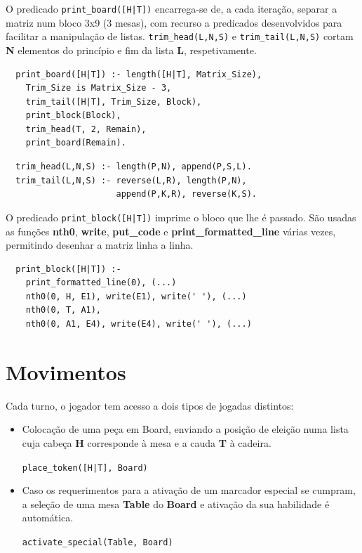 \documentclass[a4paper]{article}
\begin{document}
O predicado \texttt{print\_board([H|T])} encarrega-se de, a cada iteração, separar a matriz num bloco 3x9 (3 mesas), com recurso a predicados desenvolvidos para facilitar a manipulação de listas. \texttt{trim\_head(L,N,S)} e \texttt{trim\_tail(L,N,S)} cortam \textbf{N} elementos do princípio e fim da lista \textbf{L}, respetivamente.

\begin{lstlisting}
  print_board([H|T]) :- length([H|T], Matrix_Size),
    Trim_Size is Matrix_Size - 3,
    trim_tail([H|T], Trim_Size, Block),
    print_block(Block),
    trim_head(T, 2, Remain),
    print_board(Remain).
\end{lstlisting}

\begin{lstlisting}
  trim_head(L,N,S) :- length(P,N), append(P,S,L).
  trim_tail(L,N,S) :- reverse(L,R), length(P,N), 
                      append(P,K,R), reverse(K,S). 
\end{lstlisting}

O predicado \texttt{print\_block([H|T])} imprime o bloco que lhe é passado. São usadas as funções \textbf{nth0}, \textbf{write}, \textbf{put\_code} e \textbf{print\_formatted\_line} várias vezes, permitindo desenhar a matriz linha a linha.

\begin {lstlisting}
  print_block([H|T]) :-
    print_formatted_line(0), (...)
    nth0(0, H, E1), write(E1), write(' '), (...)
    nth0(0, T, A1),
    nth0(0, A1, E4), write(E4), write(' '), (...)
\end{lstlisting}

\newpage
\section{Movimentos}

Cada turno, o jogador tem acesso a dois tipos de jogadas distintos:

\begin{itemize}
\item Colocação de uma peça em Board, enviando a posição de eleição numa lista cuja cabeça \textbf{H} corresponde à mesa e a cauda \textbf{T} à cadeira.

\texttt{place\_token([H|T], Board)}

\item Caso os requerimentos para a ativação de um marcador especial se cumpram, a seleção de uma mesa \textbf{Table} do \textbf{Board} e ativação da sua habilidade é automática.

\texttt{activate\_special(Table, Board)}
\end{itemize}
\end{document}
